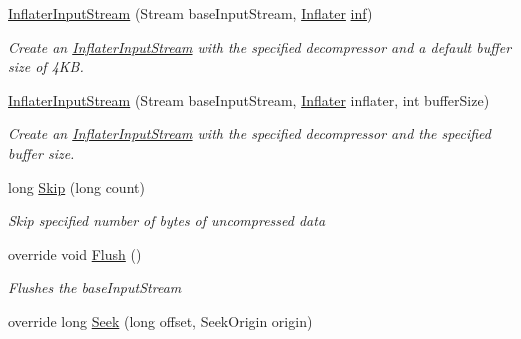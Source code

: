 \begin{DoxyCompactItemize}
\hyperlink{class_i_c_sharp_code_1_1_sharp_zip_lib_1_1_zip_1_1_compression_1_1_streams_1_1_inflater_input_stream_a3be51c98d69f9420259ea0a2a081dcd1}{Inflater\+Input\+Stream} (Stream base\+Input\+Stream, \hyperlink{class_i_c_sharp_code_1_1_sharp_zip_lib_1_1_zip_1_1_compression_1_1_inflater}{Inflater} \hyperlink{class_i_c_sharp_code_1_1_sharp_zip_lib_1_1_zip_1_1_compression_1_1_streams_1_1_inflater_input_stream_a3466996b573725de7021f7a74958514b}{inf})
\begin{DoxyCompactList}\small\item\em Create an \hyperlink{class_i_c_sharp_code_1_1_sharp_zip_lib_1_1_zip_1_1_compression_1_1_streams_1_1_inflater_input_stream}{Inflater\+Input\+Stream} with the specified decompressor and a default buffer size of 4\+KB. \end{DoxyCompactList}\item 
\hyperlink{class_i_c_sharp_code_1_1_sharp_zip_lib_1_1_zip_1_1_compression_1_1_streams_1_1_inflater_input_stream_af988bfe68d18362c690e6f7cb0e7c0eb}{Inflater\+Input\+Stream} (Stream base\+Input\+Stream, \hyperlink{class_i_c_sharp_code_1_1_sharp_zip_lib_1_1_zip_1_1_compression_1_1_inflater}{Inflater} inflater, int buffer\+Size)
\begin{DoxyCompactList}\small\item\em Create an \hyperlink{class_i_c_sharp_code_1_1_sharp_zip_lib_1_1_zip_1_1_compression_1_1_streams_1_1_inflater_input_stream}{Inflater\+Input\+Stream} with the specified decompressor and the specified buffer size. \end{DoxyCompactList}\item 
long \hyperlink{class_i_c_sharp_code_1_1_sharp_zip_lib_1_1_zip_1_1_compression_1_1_streams_1_1_inflater_input_stream_ac10ceeea77e8db40068875b66ca86f42}{Skip} (long count)
\begin{DoxyCompactList}\small\item\em Skip specified number of bytes of uncompressed data \end{DoxyCompactList}\item 
override void \hyperlink{class_i_c_sharp_code_1_1_sharp_zip_lib_1_1_zip_1_1_compression_1_1_streams_1_1_inflater_input_stream_a8a6bdcbf6dad8f9b58ca65127e7ac523}{Flush} ()
\begin{DoxyCompactList}\small\item\em Flushes the base\+Input\+Stream \end{DoxyCompactList}\item 
override long \hyperlink{class_i_c_sharp_code_1_1_sharp_zip_lib_1_1_zip_1_1_compression_1_1_streams_1_1_inflater_input_stream_ade431915c314b6f8fb4c08f6f55ce14d}{Seek} (long offset, Seek\+Origin origin)

\end{DoxyCompactItemize}
